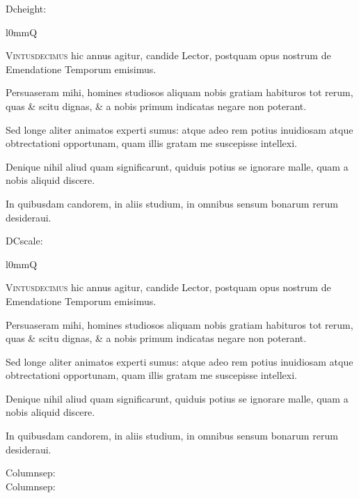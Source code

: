 \setcounter{parcount}{0}
\begin{parnumbers}

\newlength{\dcunit}\setlength{\dcunit}{1.4\baselineskip}
\newlength{\dcscale}\setlength{\dcscale}{12\dcunit}
\addtolength{\dcscale}{-0.5\dcunit}
Dcheight: \the\dcscale

\setlength{\columnsep}{1pt}\begin{wrapfigure}[12]{l}{0mm}{\fontsize{\dcscale}{1em}\selectfont Q}\end{wrapfigure}
\textsc{Vintusdecimus} hic annus agitur, candide Lector, postquam opus nostrum de Emendatione Temporum emisimus.

Persuaseram mihi, homines studiosos aliquam nobis gratiam habituros tot rerum, quas \& scitu dignas, \& a nobis primum indicatas negare non poterant.

Sed longe aliter animatos experti sumus: atque adeo rem potius inuidiosam atque obtrectationi opportunam, quam illis gratam me suscepisse intellexi.

Denique nihil aliud quam significarunt, quiduis potius se ignorare malle, quam a nobis aliquid discere.

In quibusdam candorem, in aliis studium, in omnibus sensum bonarum rerum desideraui.
\end{parnumbers}

\setcounter{parcount}{0}
\begin{parnumbers}

\setlength{\dcunit}{1.1\baselineskip}
\setlength{\dcscale}{3\dcunit}
\addtolength{\dcscale}{-0.5\dcunit}
DCscale: \the\dcscale

\setlength{\columnsep}{1pt}\begin{wrapfigure}[3]{l}{0mm}{\dropcapfont\fontsize{\dcscale}{1em}\selectfont Q}\end{wrapfigure}
\textsc{Vintusdecimus} hic annus agitur, candide Lector, postquam opus nostrum de Emendatione Temporum emisimus.

Persuaseram mihi, homines studiosos aliquam nobis gratiam habituros tot rerum, quas \& scitu dignas, \& a nobis primum indicatas negare non poterant.

Sed longe aliter animatos experti sumus: atque adeo rem potius inuidiosam atque obtrectationi opportunam, quam illis gratam me suscepisse intellexi.

Denique nihil aliud quam significarunt, quiduis potius se ignorare malle, quam a nobis aliquid discere.

In quibusdam candorem, in aliis studium, in omnibus sensum bonarum rerum desideraui.
\end{parnumbers}

Columnsep: \the\columnsep\\
\setlength{\columnsep}{1pt}
Columnsep: \the\columnsep\\

 \lipsum[1]
